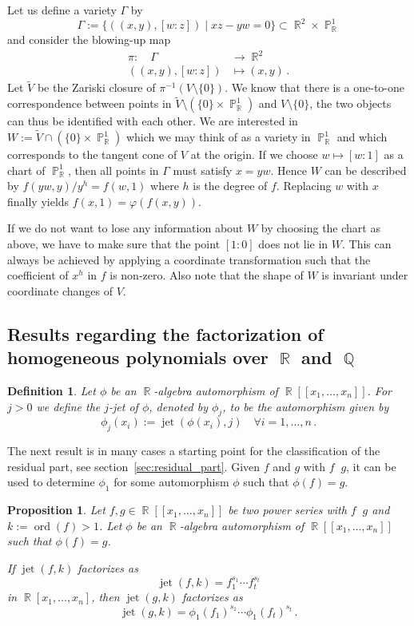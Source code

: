 \documentclass[noend]{amsproc}
\newtheorem{defn}[theorem]{Definition}
\newtheorem{prop}[theorem]{Proposition}
\DeclareMathOperator{\ord}{ord}
\DeclareMathOperator{\requiv}{\overset{r}{\sim}}
\DeclareMathOperator{\jet}{jet}
\DeclareMathOperator{\Q}{\mathbb{Q}}
\DeclareMathOperator{\R}{\mathbb{R}}
\DeclareMathOperator{\Pj}{\mathbb{P}}
\begin{document}
Let us define a variety $\Gamma$ by
\[
\Gamma := \{ ((x,y), [w:z]) \mid xz-yw = 0 \} \subset \R^2 \times \Pj_{\R}^1
\]
and consider the blowing-up map
\begin{align*}
\pi: \quad \Gamma &\rightarrow \R^2 \\
((x,y), [w:z]) &\mapsto (x,y) \,.
\end{align*}
Let $\widetilde{V}$ be the Zariski closure of $\pi^{-1}(V\setminus\{0\})$. We
know that there is a one-to-one correspondence between points in
$\widetilde{V} \setminus (\{0\} \times \Pj_{\R}^1)$ and $V\setminus\{0\}$, the
two objects can thus be identified with each other. We are interested in
$W := \widetilde{V} \cap (\{0\} \times \Pj_{\R}^1)$ which we may think of as a
variety in $\Pj_{\R}^1$ and which corresponds to the tangent cone of $V$ at the
origin. If we choose $w \mapsto [w:1]$ as a chart of $\Pj_{\R}^1$, then all
points in $\Gamma$ must satisfy $x = yw$. Hence $W$ can be described by
$f(yw,y)/y^h = f(w,1)$ where $h$ is the degree of $f$. Replacing $w$ with $x$
finally yields $f(x,1) = \varphi(f(x,y))$.

If we do not want to lose any information about $W$ by choosing the chart as
above, we have to make sure that the point $[1:0]$ does not lie in $W$. This
can always be achieved by applying a coordinate transformation such that the
coefficient of $x^h$ in $f$ is non-zero. Also note that the shape of $W$ is
invariant under coordinate changes of $V$.


\subsection{Results regarding the factorization of homogeneous polynomials
over $\R$ and $\Q$}%
\label{ResultsRegardingTheFactorizationOfHomogeneousPolynomialsOverRAndQ}

\begin{defn}
Let $\phi$ be an $\R$-algebra automorphism of $\R[[x_1,\ldots,x_n]]$.
For $j > 0$ we define the
\emph{$j$-jet} of $\phi$, denoted by $\phi_j$, to be the automorphism given by
\[
\phi_j(x_i) := \jet(\phi(x_i),j) \quad \forall i = 1,\ldots,n \,.
\]
\end{defn}

The next result is in many cases a starting point for the classification of the
residual part, see section~\ref{sec:residual_part}. Given $f$ and $g$ with $f
\requiv g$, it can be used to determine $\phi_1$ for some automorphism $\phi$
such that $\phi(f) = g$.

\begin{prop}\label{kjet}
Let $f,g \in \R[[x_1,\ldots,x_n]]$ be two power series with $f \requiv g$ and
$k := \ord(f) > 1$. Let $\phi$ be an $\R$-algebra automorphism of
$\R[[x_1,\ldots,x_n]]$ such that $\phi(f)=g$.

If $\jet(f,k)$ factorizes as
\[
\jet(f,k) = f_1^{s_1} \cdots f_t^{s_t}
\]
in $\R[x_1,\ldots,x_n]$, then $\jet(g,k)$ factorizes as
\[
\jet(g,k) = \phi_1(f_1)^{s_1} \cdots \phi_1(f_t)^{s_t} \,.
\]
\end{prop}
\end{document}
